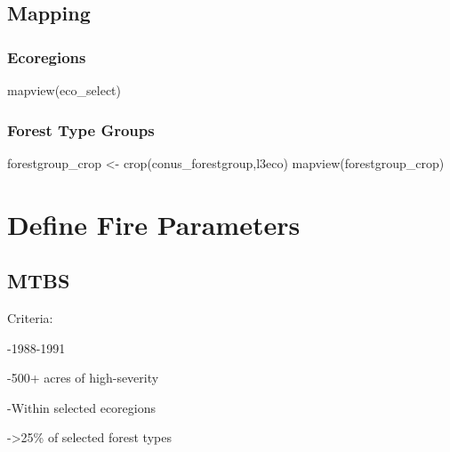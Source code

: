 \documentclass[
]{book}
\newenvironment{Shaded}{\begin{snugshade}}{\end{snugshade}}
\newcommand{\FunctionTok}[1]{\textcolor[rgb]{0.00,0.00,0.00}{#1}}
\newcommand{\NormalTok}[1]{#1}
\newcommand{\OtherTok}[1]{\textcolor[rgb]{0.56,0.35,0.01}{#1}}
\begin{document}
\hypertarget{mapping}{%
\section{Mapping}\label{mapping}}

\hypertarget{ecoregions}{%
\subsection{Ecoregions}\label{ecoregions}}

\begin{Shaded}
\begin{Highlighting}[]
\FunctionTok{mapview}\NormalTok{(eco\_select)}
\end{Highlighting}
\end{Shaded}

\hypertarget{forest-type-groups}{%
\subsection{Forest Type Groups}\label{forest-type-groups}}

\begin{Shaded}
\begin{Highlighting}[]
\NormalTok{forestgroup\_crop }\OtherTok{\textless{}{-}} \FunctionTok{crop}\NormalTok{(conus\_forestgroup,l3eco)}
\FunctionTok{mapview}\NormalTok{(forestgroup\_crop)}
\end{Highlighting}
\end{Shaded}

\hypertarget{define-fire-parameters}{%
\chapter{Define Fire Parameters}\label{define-fire-parameters}}

\hypertarget{mtbs}{%
\section{MTBS}\label{mtbs}}

Criteria:

-1988-1991

-500+ acres of high-severity

-Within selected ecoregions

-\textgreater25\% of selected forest types
\end{document}
